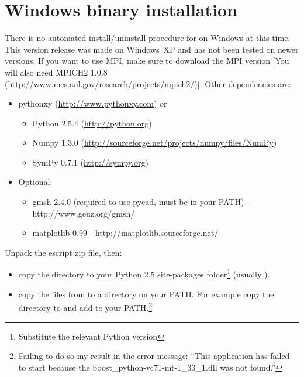 %
%
%

\section{Windows binary installation}
\label{sec:binwin}

There is no automated install/uninstall procedure for \esfinley on Windows at this time.
This version release was made on Windows~XP and has not been tested on newer versions.
If you want to use MPI, make sure to download the MPI version [You will also need 
MPICH2 1.0.8 (\url{http://www.mcs.anl.gov/research/projects/mpich2/})].
Other dependencies are:
\begin{itemize}
 \item pythonxy (\url{http://www.pythonxy.com}) or 
  \begin{itemize}
	\item Python 2.5.4 (\url{http://python.org})
	\item Numpy 1.3.0 (\url{http://sourceforge.net/projects/numpy/files/NumPy})
	\item SymPy 0.7.1 (\url{http://sympy.org})
  \end{itemize}
  \item Optional:
  \begin{itemize}
 \item gmsh 2.4.0 (required to use pycad, must be in your PATH) - http://www.geuz.org/gmsh/
\item matplotlib 0.99 - http://matplotlib.sourceforge.net/
\end{itemize}

\end{itemize}


Unpack the escript zip file, then:
\begin{itemize}
\item 
 copy the  directory to your Python 2.5 site-packages folder\footnote{Substitute the relevant
 Python version}
 (usually ).
\item 
 copy the  files from  to a directory on your PATH. For example copy the directory to  and add   to your PATH.\footnote{Failing to do so my result in the error message:
``This application has failed to start because the boost_python-vc71-mt-1_33_1.dll was not found.''
}
\end{itemize}

